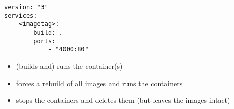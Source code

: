 \begin{lstlisting}
version: "3"
services: 
    <imagetag>: 
        build: .
        ports: 
            - "4000:80"
\end{lstlisting}

\begin{itemize}
    \item {} (builds and) runs the container(s)
    \item {} forces a rebuild of all images and runs the containers
    \item {} stops the containers and deletes them (but leaves the images intact)
\end{itemize}
